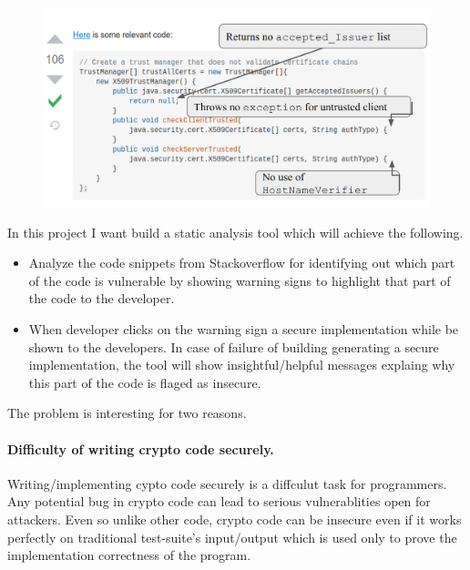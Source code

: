    \label{into}

   \begin{figure}
   \includegraphics[width=\linewidth]{Figures/SO_ss.png}
   \caption{}
   \label{fig:SO_screenshot}
   \end{figure}
   
   In this project I want build a static analysis tool which will achieve the following. 
   \begin{itemize}
   \item  Analyze the code snippets from Stackoverflow for identifying out which part of the code is vulnerable by showing warning signs to highlight that part of the code to the developer.
   \item When developer clicks on the warning sign a secure implementation while be shown to the developers. In case of failure of building generating a secure implementation, the tool will show insightful/helpful messages explaing why this part of the code is flaged as insecure.  
   \end{itemize}
   
   The problem is interesting for two reasons. 
   
   \paragraph{Difficulty of writing crypto code securely.} Writing/implementing cypto code securely is a diffculut task for programmers. Any potential bug in crypto code can lead to serious vulnerablities open for attackers.
   Even so unlike other code, crypto code can be insecure even if it works 
   perfectly on traditional test-suite's input/output which is used only to prove the implementation correctness of the program.
   
